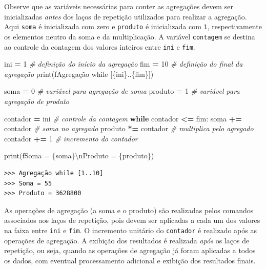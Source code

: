 \documentclass[
]{book}
\newenvironment{Shaded}{\begin{snugshade}}{\end{snugshade}}
\newcommand{\BuiltInTok}[1]{#1}
\newcommand{\CharTok}[1]{\textcolor[rgb]{0.31,0.60,0.02}{#1}}
\newcommand{\CommentTok}[1]{\textcolor[rgb]{0.56,0.35,0.01}{\textit{#1}}}
\newcommand{\ControlFlowTok}[1]{\textcolor[rgb]{0.13,0.29,0.53}{\textbf{#1}}}
\newcommand{\DecValTok}[1]{\textcolor[rgb]{0.00,0.00,0.81}{#1}}
\newcommand{\NormalTok}[1]{#1}
\newcommand{\OperatorTok}[1]{\textcolor[rgb]{0.81,0.36,0.00}{\textbf{#1}}}
\newcommand{\SpecialCharTok}[1]{\textcolor[rgb]{0.00,0.00,0.00}{#1}}
\newcommand{\SpecialStringTok}[1]{\textcolor[rgb]{0.31,0.60,0.02}{#1}}
\begin{document}
Observe que as variáveis necessárias para conter as agregações devem ser inicializadas \emph{antes} dos laços de repetição utilizados para realizar a agregação. Aqui \texttt{soma} é inicializada com zero e \texttt{produto} é inicializada com \texttt{1}, respectivamente os elementos neutro da soma e da multiplicação. A variável \texttt{contagem} se destina ao controle da contagem dos valores inteiros entre \texttt{ini} e \texttt{fim}.

\begin{Shaded}
\begin{Highlighting}[]
\NormalTok{ini }\OperatorTok{=} \DecValTok{1} \CommentTok{\# definição do início da agregação}
\NormalTok{fim }\OperatorTok{=} \DecValTok{10} \CommentTok{\# definição do final da agregação}
\BuiltInTok{print}\NormalTok{(}\SpecialStringTok{f\textquotesingle{}Agregação while [}\SpecialCharTok{\{}\NormalTok{ini}\SpecialCharTok{\}}\SpecialStringTok{..}\SpecialCharTok{\{}\NormalTok{fim}\SpecialCharTok{\}}\SpecialStringTok{]\textquotesingle{}}\NormalTok{)}

\NormalTok{soma }\OperatorTok{=} \DecValTok{0} \CommentTok{\# variável para agregação de soma}
\NormalTok{produto }\OperatorTok{=} \DecValTok{1} \CommentTok{\# variável para agregação de produto}

\NormalTok{contador }\OperatorTok{=}\NormalTok{ ini }\CommentTok{\# controle da contagem}
\ControlFlowTok{while}\NormalTok{ contador }\OperatorTok{\textless{}=}\NormalTok{ fim:}
\NormalTok{    soma }\OperatorTok{+=}\NormalTok{ contador }\CommentTok{\# soma no agregado}
\NormalTok{    produto }\OperatorTok{*=}\NormalTok{ contador }\CommentTok{\# multiplica pelo agregado}
\NormalTok{    contador }\OperatorTok{+=} \DecValTok{1} \CommentTok{\# incremento do contador}
    
\BuiltInTok{print}\NormalTok{(}\SpecialStringTok{f\textquotesingle{}Soma = }\SpecialCharTok{\{}\NormalTok{soma}\SpecialCharTok{\}}\CharTok{\textbackslash{}n}\SpecialStringTok{Produto = }\SpecialCharTok{\{}\NormalTok{produto}\SpecialCharTok{\}}\SpecialStringTok{\textquotesingle{}}\NormalTok{)}
\end{Highlighting}
\end{Shaded}

\begin{verbatim}
>>> Agregação while [1..10]
>>> Soma = 55
>>> Produto = 3628800
\end{verbatim}

As operações de agregação (a soma e o produto) são realizadas pelos comandos associados aos laços de repetição, pois devem ser aplicadas a cada um dos valores na faixa entre \texttt{ini} e \texttt{fim}. O incremento unitário do \texttt{contador} é realizado após as operações de agregação. A exibição dos resultados é realizada \emph{após} os laços de repetição, ou seja, quando as operações de agregação já foram aplicadas a todos os dados, com eventual processamento adicional e exibição dos resultados finais.
\end{document}
